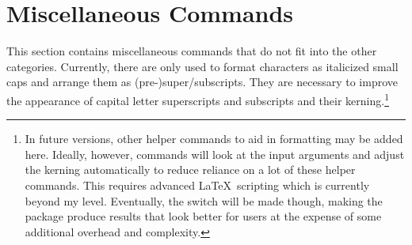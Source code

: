 \section{Miscellaneous Commands}
\label{sec:misc}
This section contains miscellaneous commands that do not fit into the other categories. Currently, there are only used to format characters as italicized small caps and arrange them as (pre-)super/subscripts. They are necessary to improve the appearance of capital letter superscripts and subscripts and their kerning.\footnote{In future versions, other helper commands to aid in formatting may be added here. Ideally, however, commands will look at the input arguments and adjust the kerning automatically to reduce reliance on a lot of these helper commands. This requires advanced \LaTeX\ scripting which is currently beyond my level. Eventually, the switch will be made though, making the package produce results that look better for users at the expense of some additional overhead and complexity.}



